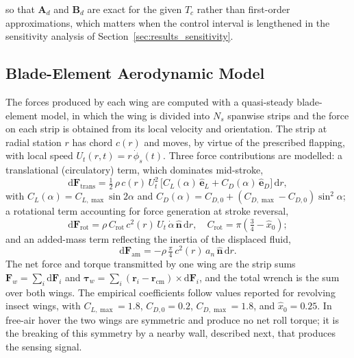 \documentclass[final,5p,times]{elsarticle}
\begin{document}
so that $\mathbf{A}_d$ and $\mathbf{B}_d$ are exact for the given $T_c$ rather than first-order approximations, which matters when the control interval is lengthened in the sensitivity analysis of Section~\ref{sec:results_sensitivity}.

\subsection{Blade-Element Aerodynamic Model}
\label{sec:method_aero}

The forces produced by each wing are computed with a quasi-steady blade-element model, in which the wing is divided into $N_s$ spanwise strips and the force on each strip is obtained from its local velocity and orientation. The strip at radial station $r$ has chord $c(r)$ and moves, by virtue of the prescribed flapping, with local speed $U_t(r,t) = r\,\dot{\phi}_s(t)$. Three force contributions are modelled: a translational (circulatory) term, which dominates mid-stroke,
\begin{equation}
    \mathrm{d}\mathbf{F}_{\mathrm{trans}} = \tfrac{1}{2}\,\rho\, c(r)\, U_t^2\, \big[ C_L(\alpha)\,\hat{\mathbf{e}}_L + C_D(\alpha)\,\hat{\mathbf{e}}_D \big]\,\mathrm{d}r,
    \label{eq:Ftrans}
\end{equation}
with $C_L(\alpha) = C_{L,\max}\sin 2\alpha$ and $C_D(\alpha) = C_{D,0} + (C_{D,\max} - C_{D,0})\sin^2\alpha$; a rotational term accounting for force generation at stroke reversal,
\begin{equation}
    \mathrm{d}\mathbf{F}_{\mathrm{rot}} = \rho\, C_{\mathrm{rot}}\, c^2(r)\, U_t\, \dot{\alpha}\, \hat{\mathbf{n}}\,\mathrm{d}r, \quad C_{\mathrm{rot}} = \pi\!\left( \tfrac{3}{4} - \hat{x}_0 \right);
    \label{eq:Frot}
\end{equation}
and an added-mass term reflecting the inertia of the displaced fluid,
\begin{equation}
    \mathrm{d}\mathbf{F}_{\mathrm{am}} = -\rho\,\tfrac{\pi}{4}\, c^2(r)\, a_n\, \hat{\mathbf{n}}\,\mathrm{d}r.
    \label{eq:Fam}
\end{equation}
The net force and torque transmitted by one wing are the strip sums $\mathbf{F}_w = \sum_i \mathrm{d}\mathbf{F}_i$ and $\boldsymbol{\tau}_w = \sum_i (\mathbf{r}_i - \mathbf{r}_{\mathrm{cm}}) \times \mathrm{d}\mathbf{F}_i$, and the total wrench is the sum over both wings. The empirical coefficients follow values reported for revolving insect wings, with $C_{L,\max}=1.8$, $C_{D,0}=0.2$, $C_{D,\max}=1.8$, and $\hat{x}_0=0.25$. In free-air hover the two wings are symmetric and produce no net roll torque; it is the breaking of this symmetry by a nearby wall, described next, that produces the sensing signal.
\end{document}

